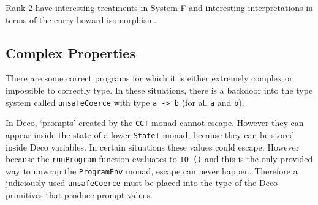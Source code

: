 \documentclass[]{article}
\newcommand{\function}[1]{\texttt{#1}}
\newcommand{\type}[1]{\texttt{#1}}
\begin{document}
Rank-2 have interesting treatments in System-F and interesting interpretations
in terms of the curry-howard isomorphism.

\subsection{Complex Properties}
\label{discussion:unsafecast}

There are some correct programs for which it is either extremely
complex or impossible to correctly type. In these situations,
there is a backdoor into the type system called \function{unsafeCoerce}
with type \type{a -> b} (for all \type{a} and \type{b}).

In Deco, `prompts' created by the \type{CCT} monad cannot escape. However they
can appear inside the state of a lower \type{StateT} monad, because they can
be stored inside Deco variables. In certain situations these values could
escape. However because the \function{runProgram} function evaluates to
\type{IO ()} and this is the only provided way to unwrap the \type{ProgramEnv}
monad, escape can never happen. Therefore a judiciously used
\function{unsafeCoerce} must be placed into the type of the Deco primitives
that produce prompt values.





\end{document}
